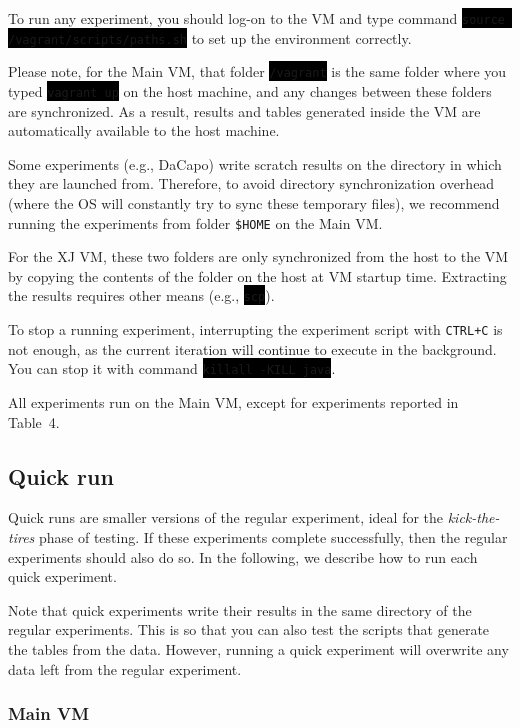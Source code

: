\documentclass[12pt]{article}
\newcommand{\command}[1]{\colorbox{black}{\texttt{\color{white}#1}}}
\newcommand{\host}[1]{\colorbox{blue!20}{\texttt{\color{black}#1}}}
\begin{document}
To run any experiment, you should log-on to the VM and type command
\command{source /vagrant/scripts/paths.sh} to set up the environment correctly.

Please note, for the Main VM, that folder \command{/vagrant} is the same folder
where you typed \command{vagrant up} on the host machine, and any changes between
these folders are synchronized.  As a result, results and tables generated
inside the VM are automatically available to the host machine.

Some experiments (e.g., DaCapo) write scratch results on the directory in which
they are launched from.  Therefore, to avoid directory synchronization overhead (where the OS will constantly try to sync these temporary files),
we recommend running the experiments from folder \host{\$HOME} on the
Main VM.

For the XJ VM, these two folders are only synchronized from the host to the VM
by copying the contents of the folder on the host at VM startup time.
Extracting the results requires other means (e.g., \command{scp}).

To stop a running experiment, interrupting the experiment script with
\texttt{CTRL+C} is not enough, as the current iteration will continue to execute
in the background.  You can stop it with command \command{killall -KILL java}.

All experiments run on the Main VM, except for experiments reported in Table~4.

\subsection{Quick run}
\label{sec:quickrun}

Quick runs are smaller versions of the regular experiment, ideal for the
\emph{kick-the-tires} phase of testing.  If these experiments complete
successfully, then the regular experiments should also do so.  In the following,
we describe how to run each quick experiment.

Note that quick experiments write their results in the same directory of the
regular experiments.  This is so that you can also test the scripts that
generate the tables from the data.  However, running a quick experiment will
overwrite any data left from the regular experiment.

\subsubsection{Main VM}
\end{document}
